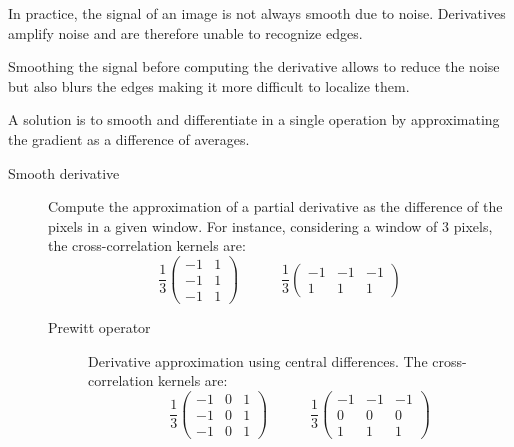 \begin{remark}
    In practice, the signal of an image is not always smooth due to noise. 
    Derivatives amplify noise and are therefore unable to recognize edges.

    Smoothing the signal before computing the derivative allows to reduce the noise but also blurs the edges making it more difficult to localize them.

    A solution is to smooth and differentiate in a single operation by approximating the gradient as a difference of averages.
\end{remark}

\begin{description}
    \item[Smooth derivative] 
        Compute the approximation of a partial derivative as the difference of the pixels in a given window.
        For instance, considering a window of 3 pixels, the cross-correlation kernels are:
        \[ \frac{1}{3} \begin{pmatrix} -1 & 1 \\ -1 & 1 \\ -1 & 1 \end{pmatrix} \hspace{3em} \frac{1}{3} \begin{pmatrix} -1 & -1 & -1 \\ 1 & 1 & 1 \end{pmatrix} \]

        \begin{description}
            \item[Prewitt operator] 
                Derivative approximation using central differences.
                The cross-correlation kernels are:
                \[ 
                    \frac{1}{3} \begin{pmatrix} -1 & 0 & 1 \\ -1 & 0 & 1 \\ -1 & 0 & 1 \end{pmatrix} 
                    \hspace{3em} 
                    \frac{1}{3} \begin{pmatrix} -1 & -1 & -1 \\ 0 & 0 & 0 \\ 1 & 1 & 1 \end{pmatrix} 
                \]


\end{description}
\end{description}
